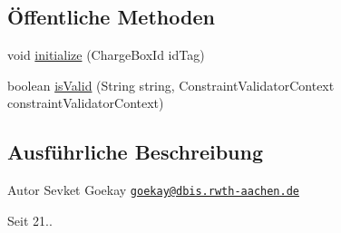 \subsection*{Öffentliche Methoden}
\begin{DoxyCompactItemize}
\item 
void \hyperlink{classde_1_1rwth_1_1idsg_1_1steve_1_1web_1_1validation_1_1_charge_box_id_validator_a71a7bf9d7e4d5179c65f4d6dccf714ae}{initialize} (Charge\+Box\+Id id\+Tag)
\item 
boolean \hyperlink{classde_1_1rwth_1_1idsg_1_1steve_1_1web_1_1validation_1_1_charge_box_id_validator_a152d18c48b0b1984b5299909c0c6c021}{is\+Valid} (String string, Constraint\+Validator\+Context constraint\+Validator\+Context)
\end{DoxyCompactItemize}


\subsection{Ausführliche Beschreibung}
\begin{DoxyAuthor}{Autor}
Sevket Goekay \href{mailto:goekay@dbis.rwth-aachen.de}{\tt goekay@dbis.\+rwth-\/aachen.\+de} 
\end{DoxyAuthor}
\begin{DoxySince}{Seit}
21.. 
\end{DoxySince}


